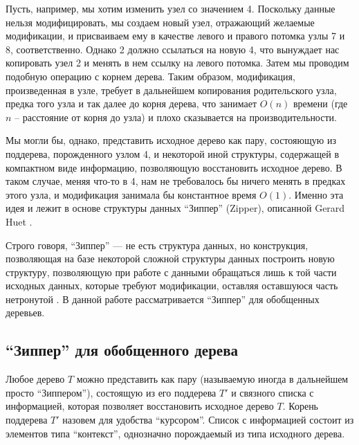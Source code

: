 Пусть, например, мы хотим изменить узел со значением 4. Поскольку данные нельзя модифицировать, мы создаем новый узел, отражающий желаемые модификации, и присваиваем ему в качестве левого и правого потомка узлы 7 и 8, соответственно. Однако 2 должно ссылаться на новую 4, что вынуждает нас копировать узел 2 и менять в нем ссылку на левого потомка. Затем мы проводим подобную операцию с корнем дерева. Таким образом, модификация, произведенная в узле, требует в дальнейшем копирования родительского узла, предка того узла и так далее до корня дерева, что занимает $O(n)$ времени (где $n$ -- расстояние от корня до узла) и плохо сказывается на производительности.

Мы могли бы, однако, представить исходное дерево как пару, состояющую из поддерева, порожденного узлом 4, и некоторой иной структуры, содержащей в компактном виде информацию, позволяющую восстановить исходное дерево. В таком случае, меняя что-то в 4, нам не требовалось бы ничего менять в предках этого узла, и модификация занимала бы константное время $O(1)$. Именно эта идея и лежит в основе структуры данных ``Зиппер'' (Zipper), описанной Gerard Huet \autocite{Huet1997}.

Строго говоря, ``Зиппер'' --- не есть структура данных, но конструкция, позволяющая на базе некоторой сложной структуры данных построить новую структуру, позволяющую при работе с данными обращаться лишь к той части исходных данных, которые требуют модификации, оставляя оставшуюся часть нетронутой \autocite{Huet1997}. В данной работе рассматривается ``Зиппер'' для обобщенных деревьев.

\subsection{``Зиппер'' для обобщенного дерева}

Любое дерево $T$ можно представить как пару (называемую иногда в дальнейшем просто ``Зиппером''), состоящую из его поддерева $T'$ и связного списка с информацией, которая позволяет восстановить исходное дерево $T$. Корень поддерева $T'$ назовем для удобства ``курсором''. Список с информацией состоит из элементов типа ``контекст'', однозначно порождаемый из типа исходного дерева.

